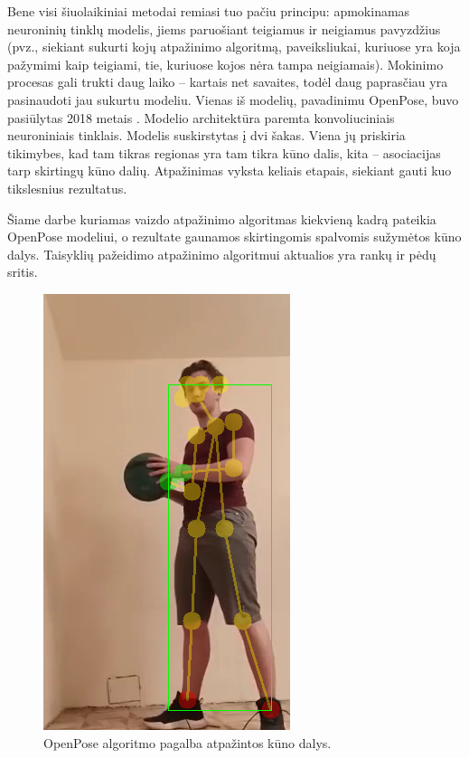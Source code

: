 \documentclass{VUMIFPSbakalaurinis}
\begin{document}
Bene visi šiuolaikiniai metodai remiasi tuo pačiu principu: apmokinamas neuroninių tinklų modelis, jiems paruošiant teigiamus ir neigiamus pavyzdžius (pvz., siekiant sukurti kojų atpažinimo algoritmą, paveiksliukai, kuriuose yra koja pažymimi kaip teigiami, tie, kuriuose kojos nėra tampa neigiamais). Mokinimo procesas gali trukti daug laiko – kartais net savaites, todėl daug paprasčiau yra pasinaudoti jau sukurtu modeliu. Vienas iš modelių, pavadinimu OpenPose, buvo pasiūlytas 2018 metais \cite{cao2019openpose}. Modelio architektūra paremta konvoliuciniais neuroniniais tinklais. Modelis suskirstytas į dvi šakas. Viena jų priskiria tikimybes, kad tam tikras regionas yra tam tikra kūno dalis, kita – asociacijas tarp skirtingų kūno dalių. Atpažinimas vyksta keliais etapais, siekiant gauti kuo tikslesnius rezultatus. 

Šiame darbe kuriamas vaizdo atpažinimo algoritmas kiekvieną kadrą pateikia OpenPose modeliui, o rezultate gaunamos skirtingomis spalvomis sužymėtos kūno dalys. Taisyklių pažeidimo atpažinimo algoritmui aktualios yra rankų ir pėdų sritis. 

\begin{figure}[H]
    \centering
    \includegraphics[scale=0.8]{img/body-parts-better}
    \caption{OpenPose algoritmo pagalba atpažintos kūno dalys.}
    \label{img:mlp}
\end{figure}
\end{document}
